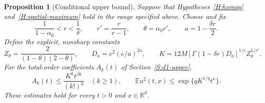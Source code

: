 \documentclass[12pt]{article}
\numberwithin{equation}{section}
\newtheorem{proposition}[theorem]{Proposition}
\theoremstyle{definition}
\newcommand{\R}{\mathbb{R}}
\newcommand{\E}{\mathbb{E}}
\begin{document}
\begin{proposition}[Conditional upper bound]\label{P:higher-transfer}
  Suppose that Hypotheses~\ref{H:homog} and~\ref{H:spatial-maximum}
  hold in the range specified above. Choose and fix
  \[
    \frac1{1-\alpha_0}<r<\frac1\delta,\qquad
    r'=\frac r{r-1},\qquad \theta=\alpha_0r',\qquad
    a=1-\frac{\delta r}{2}.
  \]
  Define the explicit, nonsharp constants
  \begin{equation}\label{E:higher-constants}
    Z_\theta=\frac2{(1-\theta)(2-\theta)},\qquad
    D_a=e^2(e/a)^{2a},\qquad
    K=12M[\Gamma(1-\delta r)D_a]^{1/r}Z_\theta^{1/r'}.
  \end{equation}
  For the total-order coefficients $A_k(t)$ of Section~\ref{S:d1-upper},
  \begin{equation}\label{E:higher-bound}
    A_k(t)\le\frac{K^kt^{\beta k}}{(k!)^q}\quad(k\ge1),
    \qquad \E u^2(t,x)\le\exp\{qK^{1/q}t^\kappa\}.
  \end{equation}
  These estimates hold for every $t>0$ and $x\in\R^d$.
\end{proposition}
\end{document}
